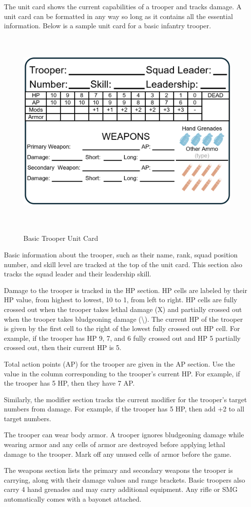 The unit card shows the current capabilities of a trooper and tracks damage.
A unit card can be formatted in any way so long as it contains all the essential information.
Below is a sample unit card for a basic infantry trooper.

\begin{figure}[H]
  \centering
  \includegraphics[alt='Sample Basic Trooper', width=5.63in, height=4in]{img/BasicTrooper.png}
  \caption*{Basic Trooper Unit Card}
\end{figure}

Basic information about the trooper, such as their name, rank, squad position number, and skill level are tracked at the top of the unit card.
This section also tracks the squad leader and their leadership skill.

Damage to the trooper is tracked in the HP section.
HP cells are labeled by their HP value, from highest to lowest, 10 to 1, from left to right.
HP cells are fully crossed out when the trooper takes lethal damage (X) and partially crossed out when the trooper takes bludgeoning damage (\textbackslash).
The current HP of the trooper is given by the first cell to the right of the lowest fully crossed out HP cell.
For example, if the trooper has HP 9, 7, and 6 fully crossed out and HP 5 partially crossed out, then their current HP is 5.

Total action points (AP) for the trooper are given in the AP section.
Use the value in the column corresponding to the trooper's current HP.
For example, if the trooper has 5 HP, then they have 7 AP.

Similarly, the modifier section tracks the current modifier for the trooper's target numbers from damage.
For example, if the trooper has 5 HP, then add +2 to all target numbers.

The trooper can wear body armor.
A trooper ignores bludgeoning damage while wearing armor and any cells of armor are destroyed before applying lethal damage to the trooper.
Mark off any unused cells of armor before the game.

The weapons section lists the primary and secondary weapons the trooper is carrying, along with their damage values and range brackets.
Basic troopers also carry 4 hand grenades and may carry additional equipment.
Any rifle or SMG automatically comes with a bayonet attached.
